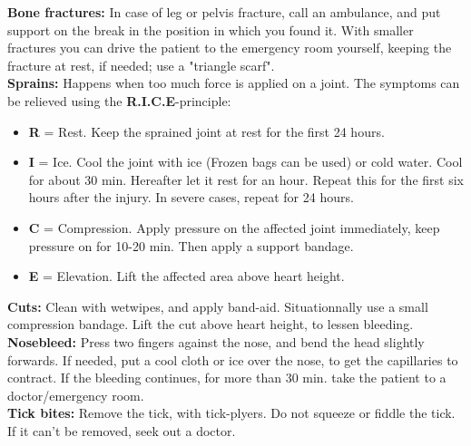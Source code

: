 \documentclass[../../../main.tex]{subfiles}
\begin{document}
\begin{multicols}{2}
\textbf{Bone fractures:} In case of leg or pelvis fracture, call an ambulance, and put support on the break in the position in which you found it. With smaller fractures you can drive the patient to the emergency room yourself, keeping the fracture at rest, if needed; use a "triangle scarf".
\\

\textbf{Sprains:} Happens when too much force is applied on a joint. The symptoms can be relieved using the  \textbf{R.I.C.E}-principle:
\begin{itemize}
    \item \textbf{R} = Rest. Keep the sprained joint at rest for the first 24 hours.

    \item \textbf{I} = Ice. Cool the joint with ice (Frozen bags can be used) or cold water. Cool for about 30 min. Hereafter let it rest for an hour. Repeat this for the first six hours after the injury. In severe cases, repeat for 24 hours.

    \item \textbf{C} = Compression. Apply pressure on the affected joint immediately, keep pressure on for 10-20 min. Then apply a support bandage.

    \item \textbf{E} = Elevation. Lift the affected area above heart height.
\end{itemize}

\textbf{Cuts:} Clean with wetwipes, and apply band-aid. Situationnally use a small compression bandage. Lift the cut above heart height, to lessen bleeding.
\\

\textbf{Nosebleed:} Press two fingers against the nose, and bend the head slightly forwards. If needed, put a cool cloth or ice over the nose, to get the capillaries to contract. If the bleeding continues, for more than 30 min. take the patient to a doctor/emergency room.
\\

\textbf{Tick bites:} Remove the tick, with tick-plyers. Do not squeeze or fiddle the tick. If it can't be removed, seek out a doctor.
\\


\end{multicols}
\end{document}
